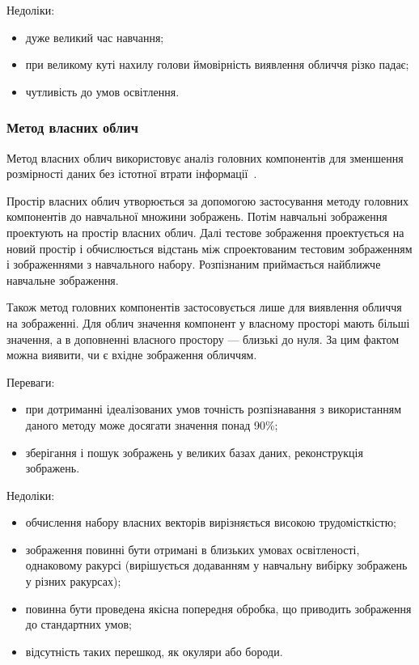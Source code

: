 Недоліки:
\begin{itemize}
	\item дуже великий час навчання;
	\item при великому куті нахилу голови ймовірність виявлення обличчя різко падає;
	\item чутливість до умов освітлення. 
\end{itemize}

\subsubsection{Метод власних облич}
Метод власних облич використовує
аналіз головних компонентів для зменшення розмірності даних без істотної втрати інформації~\cite{Turk1991}.

Простір власних облич утворюється за допомогою застосування методу головних компонентів до навчальної множини зображень. 
Потім навчальні зображення проектують на простір власних облич. 
Далі тестове зображення проектується на новий простір і обчислюється відстань між спроектованим тестовим зображенням і зображеннями з навчального набору. 
Розпізнаним приймається найближче навчальне зображення.

Також метод головних компонентів застосовується лише для виявлення обличчя на зображенні. 
Для облич значення компонент у власному просторі мають більші значення, а в доповненні власного простору --- близькі до нуля. 
За цим фактом можна виявити, чи є вхідне зображення обличчям.

Переваги:
\begin{itemize}
	\item при дотриманні ідеалізованих умов точність розпізнавання з використанням даного методу може досягати значення понад 90\%;
	\item зберігання і пошук зображень у великих базах даних, реконструкція зображень.
\end{itemize}

Недоліки:
\begin{itemize}
	\item обчислення набору власних векторів вирізняється високою трудомісткістю;
	\item зображення повинні бути отримані в близьких умовах освітленості, однаковому ракурсі (вирішується додаванням у навчальну вибірку зображень у різних ракурсах);
	\item повинна бути проведена якісна попередня обробка, що приводить зображення до стандартних умов;
	\item відсутність таких перешкод, як окуляри або бороди.
\end{itemize}

